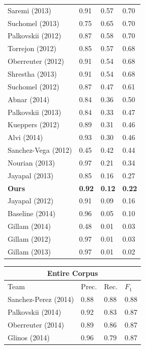 \begin{table}[th]
\begin{tabularx}{.31\textwidth}{@{}l*{3}{X}}
Saremi (2013)        &       0.91 &   0.57 &  0.70 \\
Suchomel (2013)      &       0.75 &   0.65 &  0.70 \\
Palkovskii (2012)    &       0.87 &   0.58 &  0.70 \\
Torrejon (2012)      &       0.85 &   0.57 &  0.68 \\
Oberreuter (2012)    &       0.91 &   0.54 &  0.68 \\
Shrestha (2013)      &       0.91 &   0.54 &  0.68 \\
Suchomel (2012)      &       0.87 &   0.47 &  0.61 \\
Abnar (2014)         &       0.84 &   0.36 &  0.50 \\
Palkovskii (2013)    &       0.84 &   0.33 &  0.47 \\
Kueppers (2012)      &       0.89 &   0.31 &  0.46 \\
Alvi (2014)          &       0.93 &   0.30 &  0.46 \\
Sanchez-Vega (2012)  &       0.45 &   0.42 &  0.44 \\
Nourian (2013)       &       0.97 &   0.21 &  0.34 \\
Jayapal (2013)       &       0.85 &   0.16 &  0.27 \\
\textbf{Ours}          &       \textbf{0.92} &   \textbf{0.12} &  \textbf{0.22} \\
Jayapal (2012)       &       0.91 &   0.09 &  0.16 \\
Baseline (2014)      &       0.96 &   0.05 &  0.10 \\
Gillam (2014)        &       0.48 &   0.01 &  0.03 \\
Gillam (2012)        &       0.97 &   0.01 &  0.03 \\
Gillam (2013)        &       0.97 &   0.01 &  0.02 \\
\bottomrule
\end{tabularx}
\hfill
\begin{tabularx}{.31\textwidth}{@{}l*{3}{X}}
\multicolumn{4}{c}{\bfseries Entire Corpus} \\
\toprule
Team                & Prec.     & Rec.   & $F_1$   \\
\midrule
Sanchez-Perez (2014) &      0.88 &   0.88 &  0.88 \\
Palkovskii (2014)    &      0.92 &   0.83 &  0.87 \\
Oberreuter (2014)    &      0.89 &   0.86 &  0.87 \\
Glinos (2014)        &      0.96 &   0.79 &  0.87 \\

\end{tabularx}
\end{table}
